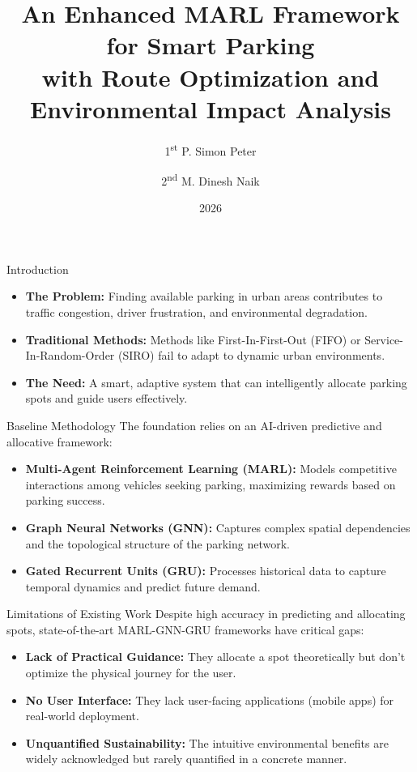 \documentclass{beamer}
\title[Smart Parking System]{An Enhanced MARL Framework for Smart Parking \\ with Route Optimization and Environmental Impact Analysis}
\author[P. Simon Peter, M. Dinesh Naik]{1\textsuperscript{st} P. Simon Peter \and 2\textsuperscript{nd} M. Dinesh Naik}
\institute[IIIT Sri City]{
  Computer Science and Engineering \\
  IIIT Sri City
}
\date{2026}
\begin{document}
\begin{frame}
  \titlepage
\end{frame}

\begin{frame}{Introduction}
  \begin{itemize}
      \item \textbf{The Problem:} Finding available parking in urban areas contributes to traffic congestion, driver frustration, and environmental degradation.
      \item \textbf{Traditional Methods:} Methods like First-In-First-Out (FIFO) or Service-In-Random-Order (SIRO) fail to adapt to dynamic urban environments.
      \item \textbf{The Need:} A smart, adaptive system that can intelligently allocate parking spots and guide users effectively.
  \end{itemize}
\end{frame}

\begin{frame}{Baseline Methodology}
  The foundation relies on an AI-driven predictive and allocative framework:
  \vspace{0.5cm}
  \begin{itemize}
      \item \textbf{Multi-Agent Reinforcement Learning (MARL):} Models competitive interactions among vehicles seeking parking, maximizing rewards based on parking success.
      \item \textbf{Graph Neural Networks (GNN):} Captures complex spatial dependencies and the topological structure of the parking network.
      \item \textbf{Gated Recurrent Units (GRU):} Processes historical data to capture temporal dynamics and predict future demand.
  \end{itemize}
\end{frame}

\begin{frame}{Limitations of Existing Work}
  Despite high accuracy in predicting and allocating spots, state-of-the-art MARL-GNN-GRU frameworks have critical gaps:
  \vspace{0.5cm}
  \begin{itemize}
      \item \textbf{Lack of Practical Guidance:} They allocate a spot theoretically but don't optimize the physical journey for the user.
      \item \textbf{No User Interface:} They lack user-facing applications (mobile apps) for real-world deployment.
      \item \textbf{Unquantified Sustainability:} The intuitive environmental benefits are widely acknowledged but rarely quantified in a concrete manner.
  \end{itemize}
\end{frame}
\end{document}
